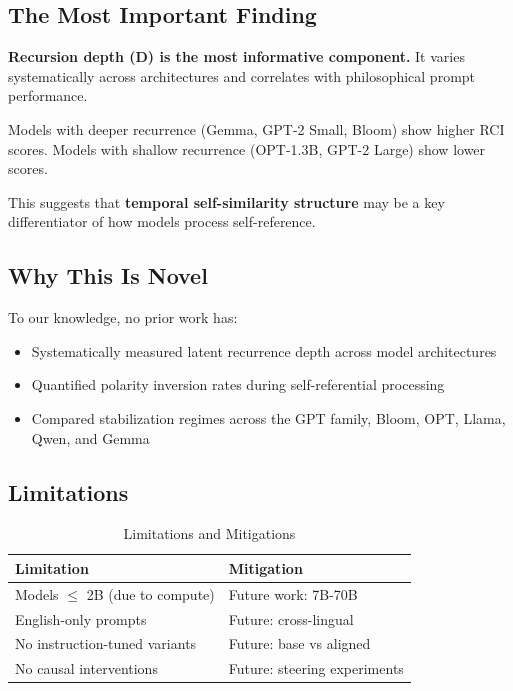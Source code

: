 \documentclass[12pt,a4paper]{article}
\begin{document}
\subsection{The Most Important Finding}

\textbf{Recursion depth (D) is the most informative component.} It varies systematically across architectures and correlates with philosophical prompt performance.

Models with deeper recurrence (Gemma, GPT-2 Small, Bloom) show higher RCI scores. Models with shallow recurrence (OPT-1.3B, GPT-2 Large) show lower scores.

This suggests that \textbf{temporal self-similarity structure} may be a key differentiator of how models process self-reference.

\subsection{Why This Is Novel}

To our knowledge, no prior work has:
\begin{itemize}[noitemsep]
    \item Systematically measured latent recurrence depth across model architectures
    \item Quantified polarity inversion rates during self-referential processing
    \item Compared stabilization regimes across the GPT family, Bloom, OPT, Llama, Qwen, and Gemma
\end{itemize}

\subsection{Limitations}

\begin{table}[h]
\centering
\caption{Limitations and Mitigations}
\begin{tabular}{ll}
\toprule
\textbf{Limitation} & \textbf{Mitigation} \\
\midrule
Models $\leq$ 2B (due to compute) & Future work: 7B-70B \\
English-only prompts & Future: cross-lingual \\
No instruction-tuned variants & Future: base vs aligned \\
No causal interventions & Future: steering experiments \\
\bottomrule
\end{tabular}
\end{table}
\end{document}
